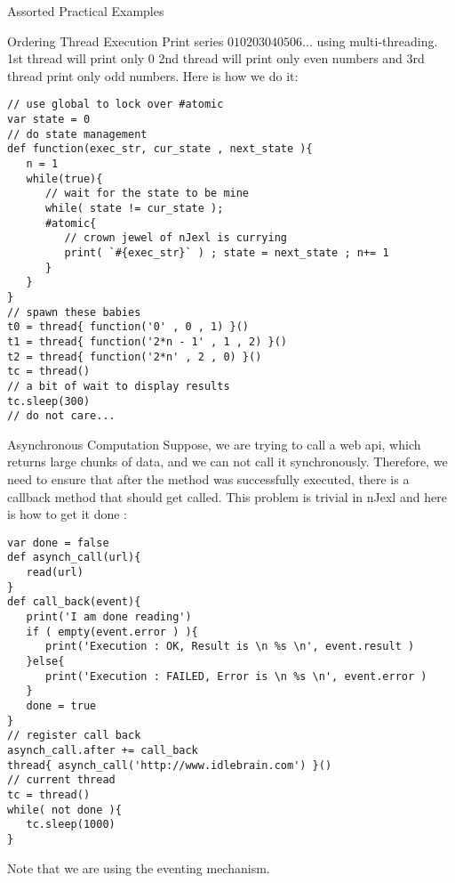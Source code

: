 \begin{section}{Assorted Practical Examples}
\begin{subsection}{Ordering Thread Execution}
Print series $010203040506...$ using multi-threading. 
1st thread will print only 0 2nd thread will print only even numbers and 3rd thread print only odd numbers. 
Here is how we do it:

\begin{center}\begin{minipage}{\linewidth}
\begin{lstlisting}[style=JexlStyle]
// use global to lock over #atomic
var state = 0 
// do state management 
def function(exec_str, cur_state , next_state ){
   n = 1 
   while(true){
      // wait for the state to be mine
      while( state != cur_state );
      #atomic{
         // crown jewel of nJexl is currying
         print( `#{exec_str}` ) ; state = next_state ; n+= 1 
      }
   } 
}
// spawn these babies 
t0 = thread{ function('0' , 0 , 1) }()
t1 = thread{ function('2*n - 1' , 1 , 2) }()
t2 = thread{ function('2*n' , 2 , 0) }()
tc = thread()
// a bit of wait to display results 
tc.sleep(300)
// do not care...
\end{lstlisting}  
\end{minipage}\end{center}
\end{subsection}

\begin{subsection}{Asynchronous Computation}
Suppose, we are trying to call a web api, which returns large chunks of data, 
and we can not call it synchronously. Therefore, we need to ensure that after
the method was successfully executed, there is a callback method that should get called.
This problem is trivial in nJexl and here is how to get it done :

\begin{center}\begin{minipage}{\linewidth}
\begin{lstlisting}[style=JexlStyle]
var done = false 
def asynch_call(url){
   read(url)
}
def call_back(event){
   print('I am done reading')
   if ( empty(event.error ) ){
      print('Execution : OK, Result is \n %s \n', event.result )
   }else{
      print('Execution : FAILED, Error is \n %s \n', event.error )
   }
   done = true 
}
// register call back 
asynch_call.after += call_back
thread{ asynch_call('http://www.idlebrain.com') }()
// current thread 
tc = thread()
while( not done ){
   tc.sleep(1000)
}
\end{lstlisting}  
\end{minipage}\end{center}
Note that we are using the eventing mechanism.

\end{subsection}

\end{section}

